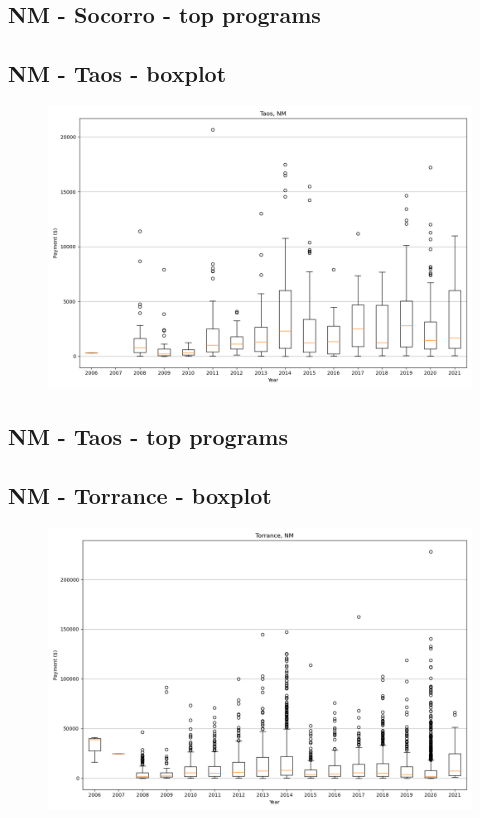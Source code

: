 \subsection*{NM - Socorro - top programs}

\newpage
\subsection*{NM - Taos - boxplot}
\begin{figure}[h]
\centering
\includegraphics[width=7in]{../output/boxplots/counties/Taos-NM_boxplot.png}
\end{figure}


\subsection*{NM - Taos - top programs}

\newpage
\subsection*{NM - Torrance - boxplot}
\begin{figure}[h]
\centering
\includegraphics[width=7in]{../output/boxplots/counties/Torrance-NM_boxplot.png}
\end{figure}


